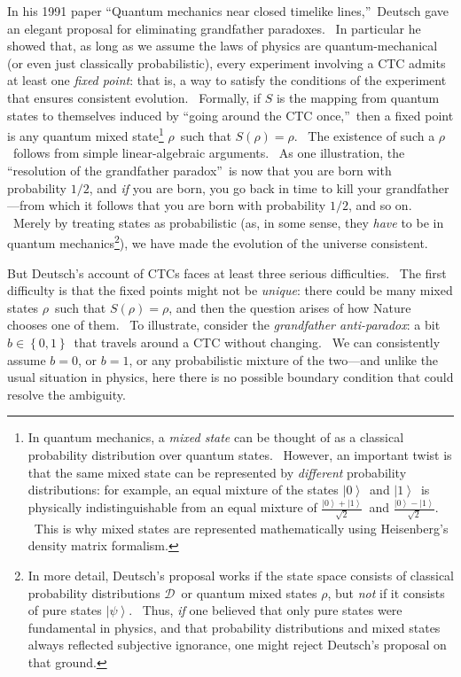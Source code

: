 \documentclass[11pt,onecolumn]{article}%
\begin{document}
In his 1991 paper \textquotedblleft Quantum mechanics near closed timelike
lines,\textquotedblright\ Deutsch \cite{deutsch:ctc} gave an elegant proposal
for eliminating grandfather paradoxes. \ In particular he showed that, as long
as we assume the laws of physics are quantum-mechanical (or even just
classically probabilistic), every experiment involving a CTC admits at least
one \textit{fixed point}: that is, a way to satisfy the conditions of the
experiment that ensures consistent evolution. \ Formally, if $S$ is the
mapping from quantum states to themselves induced by \textquotedblleft going
around the CTC once,\textquotedblright\ then a fixed point is any quantum
mixed state\footnote{In quantum mechanics, a \textit{mixed state} can be
thought of as a classical probability distribution over quantum states.
\ However, an important twist is that the same mixed state can be represented
by \textit{different} probability distributions: for example, an equal mixture
of the states $\left\vert 0\right\rangle $\ and $\left\vert 1\right\rangle
$\ is physically indistinguishable from an equal mixture of $\frac{\left\vert
0\right\rangle +\left\vert 1\right\rangle }{\sqrt{2}}$\ and $\frac{\left\vert
0\right\rangle -\left\vert 1\right\rangle }{\sqrt{2}}$. \ This is why mixed
states are represented mathematically using Heisenberg's density matrix
formalism.} $\rho$\ such that $S\left(  \rho\right)  =\rho$. \ The existence
of such a $\rho$\ follows from simple linear-algebraic arguments. \ As one
illustration, the \textquotedblleft resolution of the grandfather
paradox\textquotedblright\ is now that you are born with probability $1/2$,
and \textit{if} you are born, you go back in time to kill your
grandfather---from which it follows that you are born with probability $1/2$,
and so on. \ Merely by treating states as probabilistic (as, in some sense,
they \textit{have} to be in quantum mechanics\footnote{In more detail,
Deutsch's proposal works if the state space consists of classical probability
distributions $\mathcal{D}$\ or quantum mixed states $\rho$, but \textit{not}
if it consists of pure states $\left\vert \psi\right\rangle $. \ Thus,
\textit{if} one believed that only pure states were fundamental in physics,
and that probability distributions and mixed states always reflected
subjective ignorance, one might reject Deutsch's proposal on that ground.}),
we have made the evolution of the universe consistent.

But Deutsch's account of CTCs faces at least three serious difficulties. \ The
first difficulty is that the fixed points might not be \textit{unique}: there
could be many mixed states $\rho$\ such that $S\left(  \rho\right)  =\rho$,
and then the question arises of how Nature chooses one of them. \ To
illustrate, consider the \textit{grandfather anti-paradox}: a bit
$b\in\left\{  0,1\right\}  $\ that travels around a CTC without changing. \ We
can consistently assume $b=0$, or $b=1$, or any probabilistic mixture of the
two---and unlike the usual situation in physics, here there is no possible
boundary condition that could resolve the ambiguity.
\end{document}
